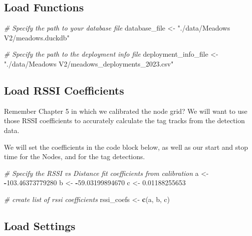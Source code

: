 \documentclass[
]{book}
\newenvironment{Shaded}{\begin{snugshade}}{\end{snugshade}}
\newcommand{\CommentTok}[1]{\textcolor[rgb]{0.56,0.35,0.01}{\textit{#1}}}
\newcommand{\FloatTok}[1]{\textcolor[rgb]{0.00,0.00,0.81}{#1}}
\newcommand{\FunctionTok}[1]{\textcolor[rgb]{0.13,0.29,0.53}{\textbf{#1}}}
\newcommand{\NormalTok}[1]{#1}
\newcommand{\OtherTok}[1]{\textcolor[rgb]{0.56,0.35,0.01}{#1}}
\newcommand{\SpecialCharTok}[1]{\textcolor[rgb]{0.81,0.36,0.00}{\textbf{#1}}}
\newcommand{\StringTok}[1]{\textcolor[rgb]{0.31,0.60,0.02}{#1}}
\begin{document}
\subsection{Load Functions}\label{load-functions}

\begin{Shaded}
\begin{Highlighting}[]
\CommentTok{\# Specify the path to your database file}
\NormalTok{database\_file }\OtherTok{\textless{}{-}} \StringTok{"./data/Meadows V2/meadows.duckdb"}

\CommentTok{\# Specify the path to the deployment info file}
\NormalTok{deployment\_info\_file }\OtherTok{\textless{}{-}} \StringTok{"./data/Meadows V2/meadows\_deployments\_2023.csv"}
\end{Highlighting}
\end{Shaded}

\subsection{Load RSSI Coefficients}\label{load-rssi-coefficients}

Remember Chapter 5 in which we calibrated the node grid? We will want to use those RSSI coefficients to accurately calculate the tag tracks from the detection data.

We will set the coefficients in the code block below, as well as our start and stop time for the Nodes, and for the tag detections.

\begin{Shaded}
\begin{Highlighting}[]
\CommentTok{\# Specify the RSSI vs Distance fit coefficients from calibration}
\NormalTok{a }\OtherTok{\textless{}{-}} \SpecialCharTok{{-}}\FloatTok{103.46373779280}
\NormalTok{b }\OtherTok{\textless{}{-}} \SpecialCharTok{{-}}\FloatTok{59.03199894670}
\NormalTok{c }\OtherTok{\textless{}{-}} \FloatTok{0.01188255653}

\CommentTok{\# create list of rssi coefficients}
\NormalTok{rssi\_coefs }\OtherTok{\textless{}{-}} \FunctionTok{c}\NormalTok{(a, b, c)}
\end{Highlighting}
\end{Shaded}

\subsection{Load Settings}\label{load-settings-2}
\end{document}

